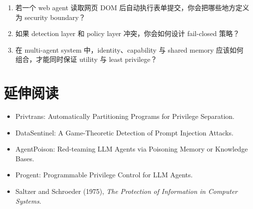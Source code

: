 \begin{enumerate}
\item 若一个 web agent 读取网页 DOM 后自动执行表单提交，你会把哪些地方定义为 security boundary？
\item 如果 detection layer 和 policy layer 冲突，你会如何设计 fail-closed 策略？
\item 在 multi-agent system 中，identity、capability 与 shared memory 应该如何组合，才能同时保证 utility 与 least privilege？
\end{enumerate}

\section{延伸阅读}

\begin{itemize}
\item Privtrans: Automatically Partitioning Programs for Privilege Separation.
\item DataSentinel: A Game-Theoretic Detection of Prompt Injection Attacks.
\item AgentPoison: Red-teaming LLM Agents via Poisoning Memory or Knowledge Bases.
\item Progent: Programmable Privilege Control for LLM Agents.
\item Saltzer and Schroeder (1975), \emph{The Protection of Information in Computer Systems}.
\end{itemize}
